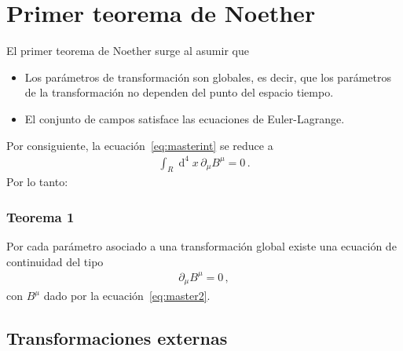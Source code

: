 \section{Primer teorema de Noether}
El primer teorema de Noether surge al asumir que
\begin{itemize}
\item Los parámetros de transformación son globales, es decir, que los parámetros de la transformación no dependen del punto del espacio tiempo.
\item El conjunto de campos satisface las ecuaciones de Euler-Lagrange.
\end{itemize}

Por consiguiente, la ecuación~\eqref{eq:masterint} se reduce a
\begin{align}
\int_R \operatorname{d}^4x \, \partial_{\mu} B^{\mu}=0\,.
\end{align}
Por lo tanto:

\subsubsection{Teorema 1}
Por  cada parámetro asociado a una transformación global  existe una ecuación de continuidad del tipo
\begin{align}
  \label{eq:dmubmu}
   \partial_{\mu} B^{\mu}=0\,,
\end{align}
con $B^{\mu}$ dado por la ecuación~\eqref{eq:master2}.

\subsection{Transformaciones externas}
\label{sec:text}

